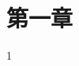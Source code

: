 \documentclass[supercite]{../upcthesis}
\begin{document}
\fi

\section{第一章}

1





\ifx\compileAllFiles\undefined
\end{document}
